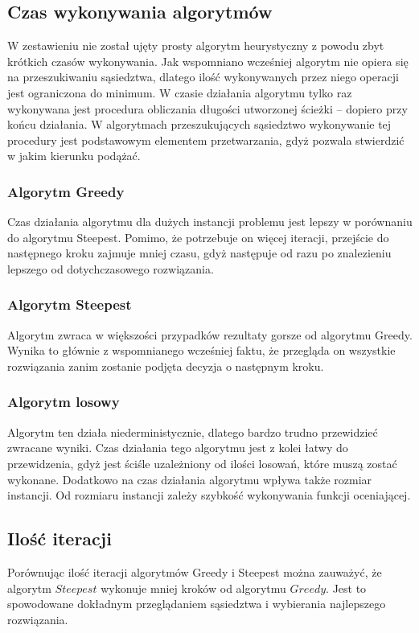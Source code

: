 \subsection{Czas wykonywania algorytmów}

W zestawieniu nie został ujęty prosty algorytm heurystyczny z
powodu zbyt krótkich czasów wykonywania. Jak wspomniano wcześniej
algorytm nie opiera się na przeszukiwaniu sąsiedztwa, dlatego
ilość wykonywanych przez niego operacji jest ograniczona do
minimum. W czasie działania algorytmu tylko raz wykonywana
jest procedura obliczania długości utworzonej ścieżki -- dopiero
przy końcu działania. W algorytmach przeszukujących sąsiedztwo
wykonywanie tej procedury jest podstawowym elementem przetwarzania,
gdyż pozwala stwierdzić w jakim kierunku podążać.


\subsubsection{Algorytm Greedy}

Czas działania algorytmu dla dużych instancji problemu jest lepszy
w porównaniu do algorytmu Steepest. Pomimo, że potrzebuje on
więcej iteracji, przejście do następnego kroku
zajmuje mniej czasu, gdyż następuje od razu po znalezieniu
lepszego od dotychczasowego rozwiązania.

\subsubsection{Algorytm Steepest}

Algorytm zwraca w większości przypadków rezultaty gorsze
od algorytmu Greedy. Wynika to głównie z wspomnianego
wcześniej faktu, że przegląda on
wszystkie rozwiązania zanim zostanie podjęta decyzja o następnym kroku.

\subsubsection{Algorytm losowy}

Algorytm ten działa niederministycznie, dlatego bardzo trudno
przewidzieć zwracane wyniki. Czas działania tego algorytmu
jest z kolei łatwy do przewidzenia, gdyż jest ściśle uzależniony
od ilości losowań, które muszą zostać wykonane. Dodatkowo na czas
działania algorytmu wpływa także rozmiar instancji. Od rozmiaru
instancji zależy szybkość wykonywania funkcji oceniającej.

\subsection{Ilość iteracji}

Porównując ilość iteracji algorytmów Greedy i Steepest można zauważyć,
że algorytm $Steepest$ wykonuje mniej kroków od algorytmu $Greedy$.
Jest to spowodowane dokładnym przeglądaniem sąsiedztwa i wybierania
najlepszego rozwiązania.
